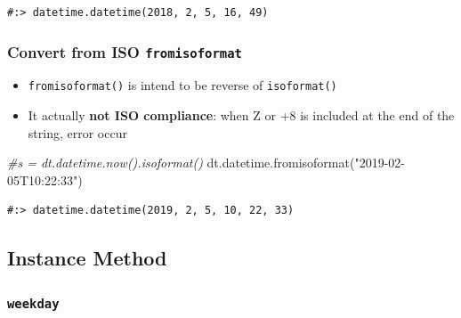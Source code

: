 \documentclass[
]{book}
\newenvironment{Shaded}{\begin{snugshade}}{\end{snugshade}}
\newcommand{\CommentTok}[1]{\textcolor[rgb]{0.37,0.37,0.37}{\textit{#1}}}
\newcommand{\NormalTok}[1]{#1}
\newcommand{\SpecialCharTok}[1]{\textcolor[rgb]{0,0,0}{#1}}
\newcommand{\StringTok}[1]{\textcolor[rgb]{0.5,0.5,0.5}{#1}}
\providecommand{\tightlist}{%
  \setlength{\itemsep}{0pt}\setlength{\parskip}{0pt}}
\begin{document}
\begin{Shaded}
\end{Shaded}

\begin{verbatim}
#:> datetime.datetime(2018, 2, 5, 16, 49)
\end{verbatim}

\hypertarget{convert-from-iso-fromisoformat-1}{%
\subsubsection{\texorpdfstring{Convert from ISO \texttt{fromisoformat}}{Convert from ISO fromisoformat}}\label{convert-from-iso-fromisoformat-1}}

\begin{itemize}
\tightlist
\item
  \texttt{fromisoformat()} is intend to be reverse of \texttt{isoformat()}\\
\item
  It actually \textbf{not ISO compliance}: when Z or +8 is included at the end of the string, error occur
\end{itemize}

\begin{Shaded}
\begin{Highlighting}[]
\CommentTok{#s = dt.datetime.now().isoformat()}
\NormalTok{dt.datetime.fromisoformat(}\StringTok{"2019-02-05T10:22:33"}\NormalTok{)}
\end{Highlighting}
\end{Shaded}

\begin{verbatim}
#:> datetime.datetime(2019, 2, 5, 10, 22, 33)
\end{verbatim}

\hypertarget{instance-method-1}{%
\subsection{Instance Method}\label{instance-method-1}}

\hypertarget{weekday}{%
\subsubsection{\texorpdfstring{\texttt{weekday}}{weekday}}\label{weekday}}
\end{document}
